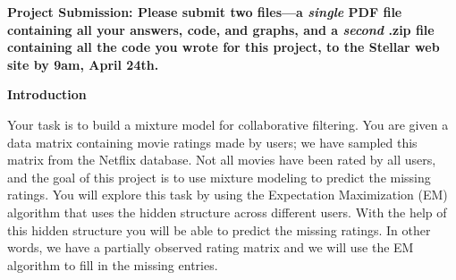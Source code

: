 

\usepackage[pdftex]{graphicx}
\usepackage{amsmath, amsthm, amssymb, amsfonts, mathtools, graphicx, enumerate}
\usepackage{times}
\usepackage{booktabs}
\usepackage{url}
\usepackage{enumerate}
\usepackage{enumitem}

\usepackage{xcolor}

\setlength{\parindent}{0pt}
\setlength{\parskip}{1ex}

\newcommand{\answer}[1]{{\mbox{}\color{red}{#1}}}
\newcommand{\emptycheck}{\text{(\hspace{-.75ex}(\hspace{3ex})\hspace{-.75ex})}}
\newcommand{\checkans}[1]{\text{(\hspace{-.75ex}(\hspace{1ex}{#1}\hspace{1ex})\hspace{-.75ex})}}
\newcommand{\argmax}{{\mbox{arg}\hspace{-.1ex}}\max}

\newcommand{\note}[1]{\textcolor{red}{#1}}




{\bf Project Submission: Please submit two files---a \emph{single} PDF file containing all your answers, code, and graphs, and a
\emph{second} .zip file containing all the code you wrote for this
project, to
the Stellar web site by 9am, April 24th.}

\textbf{Introduction}

Your task is to build a mixture model for collaborative filtering. You are given a data matrix containing movie ratings made by users; we have sampled this matrix from the Netflix database. Not all movies have been rated by all users, and the goal of this project is to use mixture modeling to predict the missing ratings. You will explore this task by using the Expectation Maximization (EM) algorithm that uses the hidden structure across different users. With the help of this hidden structure you will be able to predict the missing ratings. In other words, we have a partially observed rating matrix and we will use the EM algorithm to fill in the missing entries.

